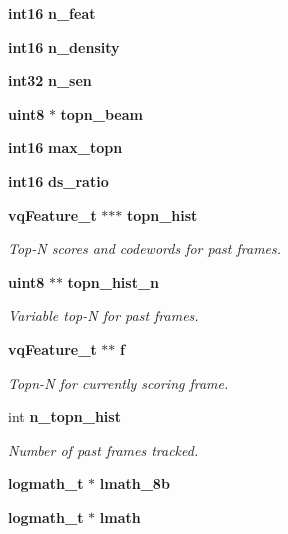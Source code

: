 \begin{DoxyCompactItemize}
\item 
{\bf int16} {\bfseries n\-\_\-feat}\label{structs2__semi__mgau__s_acc27ab32c9306b266eb8dbeb992b0dc2}

\item 
{\bf int16} {\bfseries n\-\_\-density}\label{structs2__semi__mgau__s_a976a8d1998fb717c7fee898eda43604b}

\item 
{\bf int32} {\bfseries n\-\_\-sen}\label{structs2__semi__mgau__s_a021287621e71f8b74f23197d0efd1e9e}

\item 
{\bf uint8} $\ast$ {\bfseries topn\-\_\-beam}\label{structs2__semi__mgau__s_af530876b144ac13df103afe2ccdba2fc}

\item 
{\bf int16} {\bfseries max\-\_\-topn}\label{structs2__semi__mgau__s_adda80afc828a938dcdd08f976417d35a}

\item 
{\bf int16} {\bfseries ds\-\_\-ratio}\label{structs2__semi__mgau__s_a91b9da8bb484f4552ba0ff47cb262d17}

\item 
{\bf vq\-Feature\-\_\-t} $\ast$$\ast$$\ast$ {\bf topn\-\_\-hist}
\begin{DoxyCompactList}\small\item\em \-Top-\/\-N scores and codewords for past frames. \end{DoxyCompactList}\item 
{\bf uint8} $\ast$$\ast$ {\bf topn\-\_\-hist\-\_\-n}
\begin{DoxyCompactList}\small\item\em \-Variable top-\/\-N for past frames. \end{DoxyCompactList}\item 
{\bf vq\-Feature\-\_\-t} $\ast$$\ast$ {\bf f}
\begin{DoxyCompactList}\small\item\em \-Topn-\/\-N for currently scoring frame. \end{DoxyCompactList}\item 
int {\bf n\-\_\-topn\-\_\-hist}
\begin{DoxyCompactList}\small\item\em \-Number of past frames tracked. \end{DoxyCompactList}\item 
{\bf logmath\-\_\-t} $\ast$ {\bfseries lmath\-\_\-8b}\label{structs2__semi__mgau__s_a1900c90c8ab30d38288fb26b402eb325}

\item 
{\bf logmath\-\_\-t} $\ast$ {\bfseries lmath}\label{structs2__semi__mgau__s_a8f8f7c72297132fb9a939c9981562ae6}

\end{DoxyCompactItemize}


